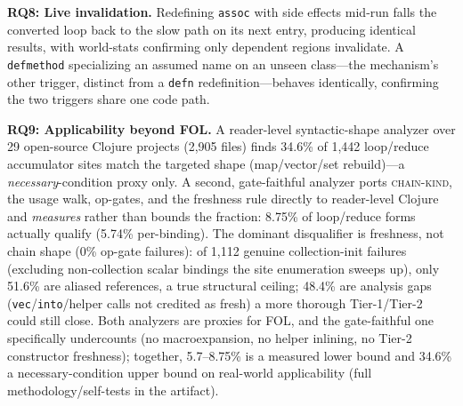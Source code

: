 \documentclass[sigplan,review,anonymous]{acmart}
\begin{document}
\textbf{RQ8: Live invalidation.} Redefining \texttt{assoc} with side effects mid-run falls the converted loop back to the slow path on its next entry, producing identical results, with world-stats confirming only dependent regions invalidate. A \texttt{defmethod} specializing an assumed name on an unseen class---the mechanism's other trigger, distinct from a \texttt{defn} redefinition---behaves identically, confirming the two triggers share one code path.

\textbf{RQ9: Applicability beyond FOL.} A reader-level syntactic-shape analyzer over 29 open-source Clojure projects (2,905 files) finds 34.6\% of 1,442 loop/reduce accumulator sites match the targeted shape (map/vector/set rebuild)---a \emph{necessary}-condition proxy only. A second, gate-faithful analyzer ports \textsc{chain-kind}, the usage walk, op-gates, and the freshness rule directly to reader-level Clojure and \emph{measures} rather than bounds the fraction: 8.75\% of loop/reduce forms actually qualify (5.74\% per-binding). The dominant disqualifier is freshness, not chain shape (0\% op-gate failures): of 1,112 genuine collection-init failures (excluding non-collection scalar bindings the site enumeration sweeps up), only 51.6\% are aliased references, a true structural ceiling; 48.4\% are analysis gaps (\texttt{vec}/\texttt{into}/helper calls not credited as fresh) a more thorough Tier-1/Tier-2 could still close. Both analyzers are proxies for FOL, and the gate-faithful one specifically undercounts (no macroexpansion, no helper inlining, no Tier-2 constructor freshness); together, 5.7--8.75\% is a measured lower bound and 34.6\% a necessary-condition upper bound on real-world applicability (full methodology/self-tests in the artifact).
\end{document}
